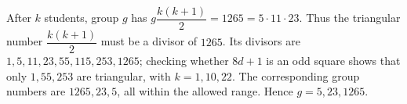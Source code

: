 After $k$ students, group $g$ has $g\dfrac{k(k+1)}{2}=1265=5\cdot11\cdot23$. Thus the triangular number $\dfrac{k(k+1)}{2}$ must be a divisor of $1265$. Its divisors are $1,5,11,23,55,115,253,1265$; checking whether $8d+1$ is an odd square shows that only $1,55,253$ are triangular, with $k=1,10,22$. The corresponding group numbers are $1265,23,5$, all within the allowed range. Hence $\boxed{g=5,23,1265}$.
